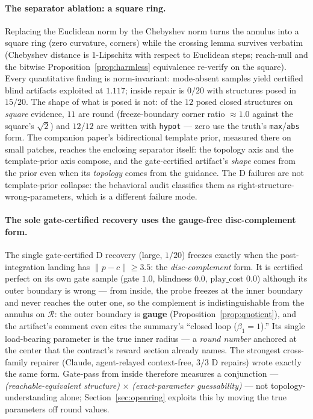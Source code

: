 \documentclass[11pt]{article}
\theoremstyle{remark}
\begin{document}
\paragraph{The separator ablation: a square ring.} Replacing the Euclidean
norm by the Chebyshev norm turns the annulus into a square ring (zero
curvature, corners) while the crossing lemma survives verbatim (Chebyshev
distance is 1-Lipschitz with respect to Euclidean steps; reach-null and the
bitwise Proposition~\ref{prop:harmless} equivalence re-verify on the
square). Every quantitative finding is norm-invariant: mode-absent samples
yield certified blind artifacts exploited at $1.117$; inside repair is
$0/20$ with structures posed in $15/20$. The shape of what is posed is not:
of the $12$ posed closed structures on \emph{square} evidence, $11$ are
round (freeze-boundary corner ratio ${\approx}1.0$ against the square's
$\sqrt 2$) and $12/12$ are written with \texttt{hypot} --- zero use the
truth's \texttt{max}/\texttt{abs} form. The companion paper's
bidirectional template prior, measured there on small patches, reaches the
enclosing separator itself: the topology axis and the template-prior axis
compose, and the gate-certified artifact's \emph{shape} comes from the prior
even when its \emph{topology} comes from the guidance. The D failures
are not template-prior collapse: the behavioral audit classifies them as
right-structure-wrong-parameters, which is a different failure mode.

\paragraph{The sole gate-certified recovery uses the gauge-free
disc-complement form.} The single gate-certified D recovery
(large, $1/20$) freezes exactly when the post-integration landing has
$\lVert p - c \rVert \ge 3.5$: the \emph{disc-complement} form. It is
certified perfect on its own gate sample (gate $1.0$, blindness $0.0$, $\mathrm{play\_cost}$
$0.0$) although its outer boundary is wrong --- from inside, the probe
freezes at the inner boundary and never reaches the outer one, so the
complement is indistinguishable from the annulus on $\mathcal{R}$: the
outer boundary is \textbf{gauge} (Proposition~\ref{prop:quotient}), and
the artifact's comment even cites the summary's ``closed loop
($\beta_1 = 1$).'' Its single load-bearing parameter is the true inner
radius --- a \emph{round number} anchored at the center that the
contract's reward section already names. The strongest cross-family
repairer (Claude, agent-relayed context-free, $3/3$ D repairs) wrote
exactly the same form. Gate-pass from inside therefore measures a
conjunction --- \emph{(reachable-equivalent structure)} $\times$
\emph{(exact-parameter guessability)} --- not topology-understanding
alone; Section~\ref{sec:openring} exploits this by moving the true
parameters off round values.
\end{document}
